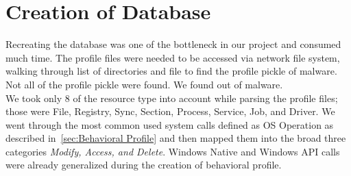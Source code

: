 \section{Creation of Database}
\label{sec:Creation of Database}
Recreating the database was one of the bottleneck in our project and consumed much time.
The profile files were needed to be accessed via network file system, walking through list of directories and file to find the profile pickle of malware.
Not all of the profile pickle were found. We found \emph{\gettotalmalwareii{}} out of \emph{\gettotalmalwarei{}} malware.\\
We took only 8 of the resource type into account while parsing the profile files; those were File, Registry, Sync, Section, Process, Service, Job, and Driver.
We went through the most common used system calls defined as OS Operation as described in~\autoref{sec:Behavioral Profile} and then mapped them into the broad three categories \emph{Modify, Access, and Delete}.
Windows Native and Windows API calls were already generalized during the creation of behavioral profile.

